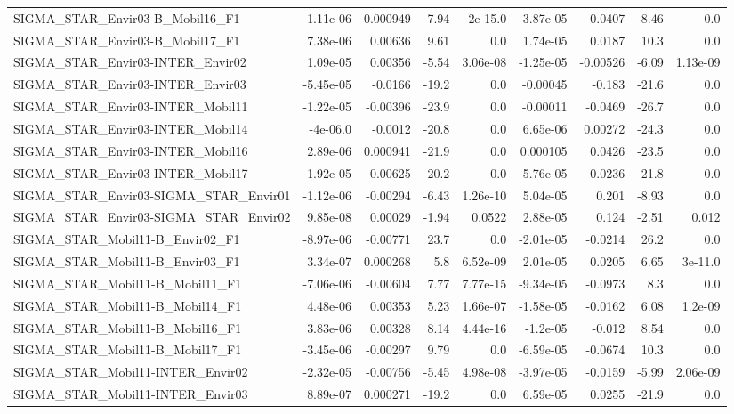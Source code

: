 \begin{tabular}{lrrrrrrrr}
SIGMA_STAR_Envir03-B_Mobil16_F1 & 1.11e-06 & 0.000949 & 7.94 & 2e-15.0 & 3.87e-05 & 0.0407 & 8.46 & 0.0 \\
SIGMA_STAR_Envir03-B_Mobil17_F1 & 7.38e-06 & 0.00636 & 9.61 & 0.0 & 1.74e-05 & 0.0187 & 10.3 & 0.0 \\
SIGMA_STAR_Envir03-INTER_Envir02 & 1.09e-05 & 0.00356 & -5.54 & 3.06e-08 & -1.25e-05 & -0.00526 & -6.09 & 1.13e-09 \\
SIGMA_STAR_Envir03-INTER_Envir03 & -5.45e-05 & -0.0166 & -19.2 & 0.0 & -0.00045 & -0.183 & -21.6 & 0.0 \\
SIGMA_STAR_Envir03-INTER_Mobil11 & -1.22e-05 & -0.00396 & -23.9 & 0.0 & -0.00011 & -0.0469 & -26.7 & 0.0 \\
SIGMA_STAR_Envir03-INTER_Mobil14 & -4e-06.0 & -0.0012 & -20.8 & 0.0 & 6.65e-06 & 0.00272 & -24.3 & 0.0 \\
SIGMA_STAR_Envir03-INTER_Mobil16 & 2.89e-06 & 0.000941 & -21.9 & 0.0 & 0.000105 & 0.0426 & -23.5 & 0.0 \\
SIGMA_STAR_Envir03-INTER_Mobil17 & 1.92e-05 & 0.00625 & -20.2 & 0.0 & 5.76e-05 & 0.0236 & -21.8 & 0.0 \\
SIGMA_STAR_Envir03-SIGMA_STAR_Envir01 & -1.12e-06 & -0.00294 & -6.43 & 1.26e-10 & 5.04e-05 & 0.201 & -8.93 & 0.0 \\
SIGMA_STAR_Envir03-SIGMA_STAR_Envir02 & 9.85e-08 & 0.00029 & -1.94 & 0.0522 & 2.88e-05 & 0.124 & -2.51 & 0.012 \\
SIGMA_STAR_Mobil11-B_Envir02_F1 & -8.97e-06 & -0.00771 & 23.7 & 0.0 & -2.01e-05 & -0.0214 & 26.2 & 0.0 \\
SIGMA_STAR_Mobil11-B_Envir03_F1 & 3.34e-07 & 0.000268 & 5.8 & 6.52e-09 & 2.01e-05 & 0.0205 & 6.65 & 3e-11.0 \\
SIGMA_STAR_Mobil11-B_Mobil11_F1 & -7.06e-06 & -0.00604 & 7.77 & 7.77e-15 & -9.34e-05 & -0.0973 & 8.3 & 0.0 \\
SIGMA_STAR_Mobil11-B_Mobil14_F1 & 4.48e-06 & 0.00353 & 5.23 & 1.66e-07 & -1.58e-05 & -0.0162 & 6.08 & 1.2e-09 \\
SIGMA_STAR_Mobil11-B_Mobil16_F1 & 3.83e-06 & 0.00328 & 8.14 & 4.44e-16 & -1.2e-05 & -0.012 & 8.54 & 0.0 \\
SIGMA_STAR_Mobil11-B_Mobil17_F1 & -3.45e-06 & -0.00297 & 9.79 & 0.0 & -6.59e-05 & -0.0674 & 10.3 & 0.0 \\
SIGMA_STAR_Mobil11-INTER_Envir02 & -2.32e-05 & -0.00756 & -5.45 & 4.98e-08 & -3.97e-05 & -0.0159 & -5.99 & 2.06e-09 \\
SIGMA_STAR_Mobil11-INTER_Envir03 & 8.89e-07 & 0.000271 & -19.2 & 0.0 & 6.59e-05 & 0.0255 & -21.9 & 0.0 \\

\end{tabular}
